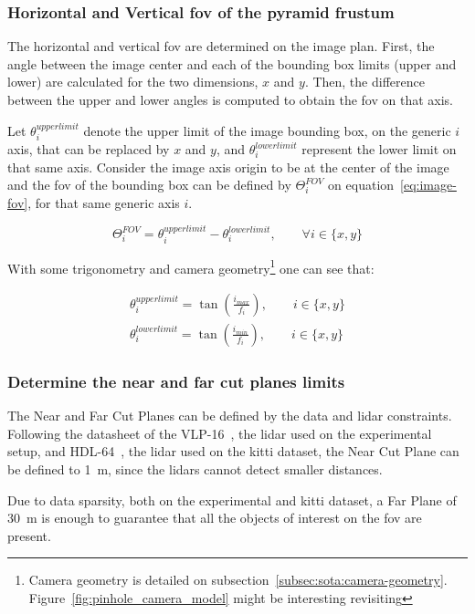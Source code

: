 \subsubsection{Horizontal and Vertical \ac{fov} of the pyramid frustum}
The horizontal and vertical \ac{fov} are determined on the image plan. First, the angle between the image center and each of the bounding box limits (upper and lower) are calculated for the two dimensions, $x$ and $y$. Then, the difference between the upper and lower angles is computed to obtain the \ac{fov} on that axis.

Let $\theta^{upper limit}_i$ denote the upper limit of the image bounding box, on the generic $i$ axis, that can be replaced by $x$ and $y$, and $\theta^{lower limit}_i$ represent the lower limit on that same axis. Consider the image axis origin to be at the center of the image and the \ac{fov} of the bounding box can be defined by $\Theta^{FOV}_i$ on equation~\ref{eq:image-fov}, for that same generic axis $i$.

\begin{equation}
	\label{eq:image-fov}
	\Theta^{FOV}_i = \theta^{upper limit}_i - \theta^{lower limit}_i, \qquad \forall i \in \{x, y\}
\end{equation}

With some trigonometry and camera geometry\footnote{Camera geometry is detailed on subsection~\ref{subsec:sota:camera-geometry}. Figure~\ref{fig:pinhole_camera_model} might be interesting revisiting} one can see that:

\begin{align}
	\theta^{upper limit}_i = \tan\left(\frac{i_{max}}{f_i}\right), \qquad i \in \{x, y\} \\
	\theta^{lower limit}_i = \tan\left(\frac{i_{min}}{f_i}\right), \qquad i \in \{x, y\} 
\end{align}

\subsubsection{Determine the near and far cut planes limits}
The Near and Far Cut Planes can be defined by the data and \ac{lidar} constraints. Following the datasheet of the VLP-16~\cite{vlp16}, the \ac{lidar} used on the experimental setup, and HDL-64~\cite{VelodyneHDL64}, the \ac{lidar} used on the \ac{kitti} dataset, the Near Cut Plane can be defined to \SI{1}{\meter}, since the \acp{lidar} cannot detect smaller distances.

Due to data sparsity, both on the experimental and  \ac{kitti} dataset, a Far Plane of \SI{30}{\meter} is enough to guarantee that all the objects of interest on the \ac{fov} are present.

